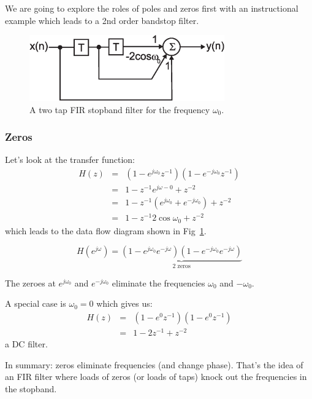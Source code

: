 \documentclass[12pt,a4paper]{article}
\begin{document}
We are going to explore the roles of poles and zeros first with
an instructional example which leads to a 2nd order bandstop filter.

\begin{figure}[!hbt]
\begin{center}
\mbox{\includegraphics[width=0.75\textwidth]{fir_stop}}
\end{center}
\caption{A two tap FIR stopband filter for the frequency $\omega_0$.
\label{fir_stop}}
\end{figure}

\subsubsection{Zeros}
Let's look at the transfer function:
\begin{eqnarray}
H(z) & = & (1 - e^{j\omega_0} z^{-1})(1 - e^{-j\omega_0} z^{-1}) \\
     & = & 1 - z^{-1} e^{j \omega-{0}} + z^{-2} \\
     & = & 1 - z^{-1} (e^{j \omega_{0}} + e^{-j \omega_{0}}) + z^{-2} \\
     & = & 1 - z^{-1} 2 \cos \omega_{0} + z^{-2}
\end{eqnarray}
which leads to the data flow diagram shown in Fig~\ref{fir_stop}.

\begin{equation}
H(e^{j\omega}) = \underbrace{(1 - e^{j\omega_0}e^{-j\omega})(1 - e^{-j\omega_0} e^{-j\omega})}_{\mbox{2 zeros}}
\end{equation}

The zeroes at 
$e^{j \omega_{0}}$ and $e^{-j \omega_0}$ 
eliminate the frequencies $\omega_{0}$ and $-\omega_{0}$. 

A special case is $\omega_{0} = 0$
which gives us:
\begin{eqnarray}
H(z) & = & (1 - e^{0} z^{-1})(1 - e^{0} z^{-1}) \\
     & = & 1 - 2 z^{-1} + z^{-2}
\end{eqnarray}
a DC filter.

In summary: zeros eliminate frequencies (and change phase).
That's the idea of an FIR filter where loads of zeros (or loads of taps)
knock out the frequencies in the stopband.
\end{document}

